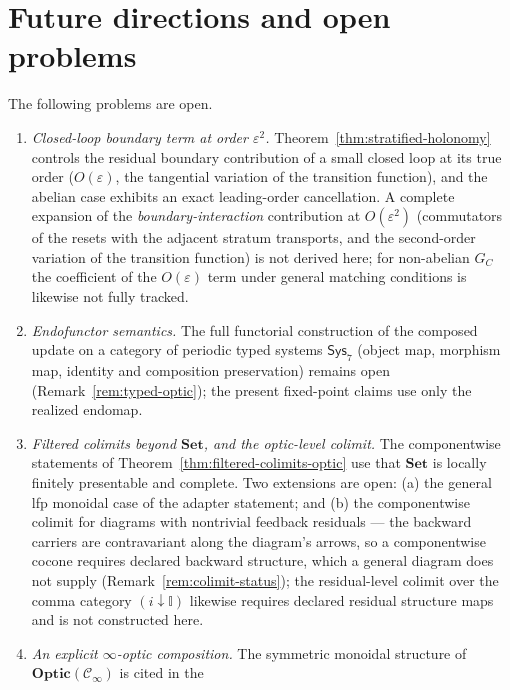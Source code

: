 \documentclass[11pt,a4paper]{article}
\theoremstyle{plain}
\theoremstyle{definition}
\theoremstyle{remark}
\newcommand{\Optic}{\mathbf{Optic}}
\begin{document}

\section{Future directions and open problems}\label{sec:future}

The following problems are open.

\begin{enumerate}[leftmargin=*,itemsep=3pt]
\item \emph{Closed-loop boundary term at order $\varepsilon^2$.}
Theorem~\ref{thm:stratified-holonomy} controls the residual boundary
contribution of a small closed loop at its true order
($O(\varepsilon)$, the tangential variation of the transition
function), and the abelian case exhibits an exact leading-order
cancellation. A complete expansion of the
\emph{boundary-interaction} contribution at $O(\varepsilon^2)$
(commutators of the resets with the adjacent stratum transports, and
the second-order variation of the transition function) is not
derived here; for non-abelian $G_C$ the coefficient of the
$O(\varepsilon)$ term under general matching conditions is likewise
not fully tracked.
\item \emph{Endofunctor semantics.} The full functorial construction
of the composed update on a category of periodic typed systems
$\mathsf{Sys}_7$ (object map, morphism map, identity and composition
preservation) remains open
(Remark~\ref{rem:typed-optic}); the present fixed-point claims use
only the realized endomap.
\item \emph{Filtered colimits beyond $\mathbf{Set}$, and the
optic-level colimit.} The componentwise statements of
Theorem~\ref{thm:filtered-colimits-optic} use that $\mathbf{Set}$ is
locally finitely presentable and complete. Two extensions are open:
(a) the general lfp monoidal case of the adapter statement; and
(b) the componentwise colimit for diagrams with nontrivial feedback
residuals --- the backward carriers are contravariant along the
diagram's arrows, so a componentwise cocone requires declared
backward structure, which a general diagram does not supply
(Remark~\ref{rem:colimit-status}); the residual-level colimit over
the comma category $(i\downarrow\mathbb I)$ likewise requires
declared residual structure maps and is not constructed here.
\item \emph{An explicit $\infty$-optic composition.} The symmetric
monoidal structure of $\Optic(\mathcal{C}_\infty)$ is cited in the

\end{enumerate}
\end{document}
